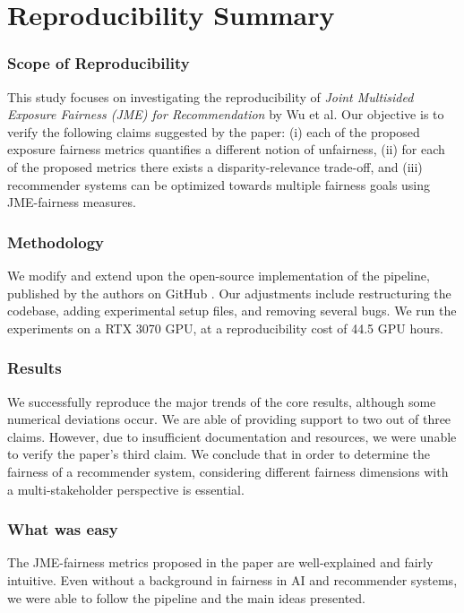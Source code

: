 \section*{\centering Reproducibility Summary}
\subsubsection*{Scope of Reproducibility} This study focuses on investigating the reproducibility of \textit{Joint Multisided Exposure Fairness (JME) for Recommendation} by Wu et al\cite{wu}. Our objective is to verify the following claims suggested by the paper: (i) each of the proposed exposure fairness metrics quantifies a different notion of unfairness, (ii) for each of the proposed metrics there exists a disparity-relevance trade-off, and (iii) recommender systems can be optimized towards multiple fairness goals using JME-fairness measures.

\subsubsection*{Methodology}
We modify and extend upon the open-source implementation of the pipeline, published by the authors on GitHub \cite{Wugit2022}. Our adjustments include restructuring the codebase, adding experimental setup files, and removing several bugs. We run the experiments on a RTX 3070 GPU, at a reproducibility cost of 44.5 GPU hours.

\subsubsection*{Results}
We successfully reproduce the major trends of the core results, although some numerical deviations occur. We are able of providing support to two out of three claims. However, due to insufficient documentation and resources, we were unable to verify the paper's third claim. We conclude that in order to determine the fairness of a recommender system, considering different fairness dimensions with a multi-stakeholder perspective is essential.

\subsubsection*{What was easy}
The JME-fairness metrics proposed in the paper are well-explained and fairly intuitive. Even without a background in fairness in AI and recommender systems, we were able to follow the pipeline and the main ideas presented.

